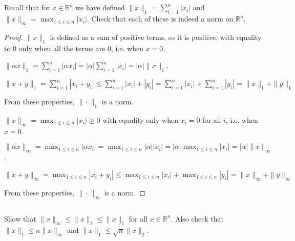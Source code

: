 \subsection{} Recall that for $x \in \mathbb{R}^n$ we have defined $\|x\|_1 = \sum_{i=1}^n |x_i|$ and $\|x\|_\infty = \max_{1 \leq i \leq n} |x_i|$. Check that each of these is indeed a norm on $\mathbb{R}^n$. 

\begin{proof}
$\|x\|_1$ is defined as a sum of positive terms, so it is positive, with equality to 0 only when all the terms are 0, i.e. when $x=0$.

$\|\alpha x\|_1 = \sum_{i=1}^n |\alpha x_i| = |\alpha| \sum_{i=1}^n |x_i| = |\alpha| \|x\|_1$.

$\|x + y\|_1 = \sum_{i=1}^n |x_i + y_i| \leq \sum_{i=1}^n |x_i| + |y_i| = \sum_{i=1}^n |x_i| + \sum_{i=1}^n |y_i| =\|x\|_1 + \|y\|_1$

From these properties, $\| \cdot \|_1$ is a norm.

$\|x\|_\infty = \max_{1 \leq i \leq n} |x_i| \geq 0$ with equality only when $x_i = 0$ for all $i$, i.e. when $x=0$.

$\|\alpha x\|_\infty = \max_{1 \leq i \leq n} |\alpha x_i| = \max_{1 \leq i \leq n} |\alpha| |x_i| =  |\alpha| \max_{1 \leq i \leq n} |x_i| = |\alpha| \|x\|_\infty$.

$\|x + y\|_\infty = \max_{1 \leq i \leq n} |x_i + y_i| \leq \max_{1 \leq i \leq n} |x_i| + \max_{1 \leq i \leq n} |y_i| = \|x\|_\infty + \|y\|_\infty $

From these properties, $\| \cdot \|_\infty$ is a norm.

\end{proof}

\subsection{} Show that $\|x\|_\infty \leq \|x\|_2 \leq \|x\|_1$ for all $x\in \mathbb{R}^n$. Also check that $\|x\|_1 \leq n\|x\|_\infty$ and $\|x\|_1 \leq \sqrt{n}\|x\|_2$.

